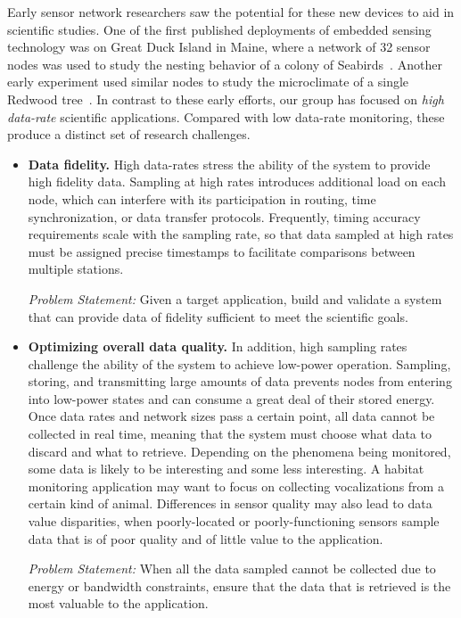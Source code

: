 Early sensor network researchers saw the potential for these new devices to
aid in scientific studies. One of the first published deployments of embedded
sensing technology was on Great Duck Island in Maine, where a network of 32
sensor nodes was used to study the nesting behavior of a colony of
Seabirds~\cite{gdi-sensys04}. Another early experiment used similar nodes to
study the microclimate of a single Redwood tree~\cite{berkeley-redwoods}.  In
contrast to these early efforts, our group has focused on \textit{high
data-rate} scientific applications. Compared with low data-rate monitoring,
these produce a distinct set of research challenges.

\begin{itemize}

\item \textbf{Data fidelity.} High data-rates stress the ability of the
system to provide high fidelity data. Sampling at high rates introduces
additional load on each node, which can interfere with its participation in
routing, time synchronization, or data transfer protocols. Frequently, timing
accuracy requirements scale with the sampling rate, so that data sampled at
high rates must be assigned precise timestamps to facilitate comparisons
between multiple stations.

\textit{Problem Statement:} Given a target application, build and validate a
system that can provide data of fidelity sufficient to meet the scientific
goals.

\item \textbf{Optimizing overall data quality.} In addition, high sampling
rates challenge the ability of the system to achieve low-power operation.
Sampling, storing, and transmitting large amounts of data prevents nodes from
entering into low-power states and can consume a great deal of their stored
energy. Once data rates and network sizes pass a certain point, all data
cannot be collected in real time, meaning that the system must choose what
data to discard and what to retrieve. Depending on the phenomena being
monitored, some data is likely to be interesting and some less interesting. A
habitat monitoring application may want to focus on collecting vocalizations
from a certain kind of animal. Differences in sensor quality may also lead to
data value disparities, when poorly-located or poorly-functioning sensors
sample data that is of poor quality and of little value to the application.

\textit{Problem Statement:} When all the data sampled cannot be collected due
to energy or bandwidth constraints, ensure that the data that is retrieved is
the most valuable to the application.


\end{itemize}

